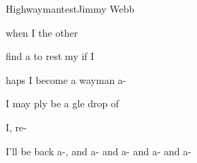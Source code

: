 \begin{SBSong}{Highwayman}{test}{Jimmy Webb}
\begin{SBVerse}
     when I  the other 

     find a  to rest my  if I 

    haps I  become a wayman a-

     I may ply be a gle drop of 

     I,  re-

     I'll be back a-, and a- and a- and a- and a-
  \end{SBVerse}
\end{SBSong}
